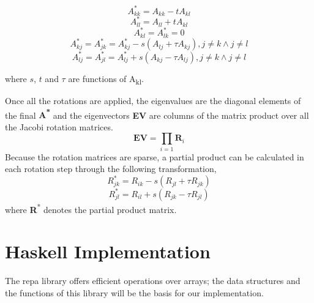 \documentclass{tmr}
\begin{document}
\begin{equation}\label{1} A^{*}_{kk} = A_{kk}  -  t A_{kl} \end{equation}
\begin{equation}\label{2} A^{*}_{ll} = A_{ll} +   t A_{kl} \end{equation}
\begin{equation}\label{3} A^{*}_{kl} =A^{*}_{lk} = 0       \end{equation}
\begin{equation}\label{4}
A^{*}_{kj} =A^{*}_{jk} = A^{*}_{kj} - s (A_{lj} + \tau A_{kj}), j \not = k \wedge j \not = l 
\end{equation}
\begin{equation}\label{5}
A^{*}_{lj} =A^{*}_{jl} = A^{*}_{lj} + s (A_{kj} - \tau A_{lj}), j \not = k \wedge j \not = l 
\end{equation}

where $s$, $t$ and $\tau$ are functions of A\textsubscript{kl}.

Once all the rotations are applied, the eigenvalues are the diagonal
elements of the final \textbf{A\textsuperscript{*}} and the eigenvectors
{\bf EV} are columns of the matrix product over all the Jacobi rotation
matrices.
%
\[ \mathbf{EV} = \prod_{i=1} \mathbf{R}_i \]
%
Because the rotation matrices are sparse, a partial product can be
calculated in each rotation step through the following transformation,
%
\begin{equation}\label{6} R^{*}_{jk} = R_{ik}  -  s (R_{jl} + \tau R_{jk}) \end{equation}
\begin{equation}\label{7} R^{*}_{jl} = R_{il}  +  s (R_{jk} - \tau R_{jl}) \end{equation}
%
where {\textbf R\textsuperscript{*}} denotes the partial product matrix.

\section{Haskell Implementation}

The repa library \cite{repa} offers efficient operations over arrays; the data
structures and the functions of this library will be the basis for our
implementation.
\end{document}
